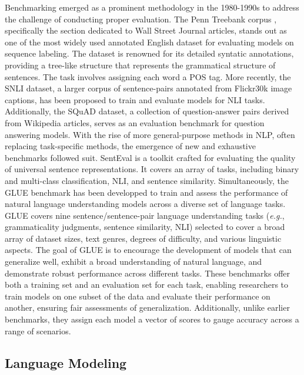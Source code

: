 Benchmarking emerged as a prominent methodology in the 1980-1990s to address the challenge of conducting proper evaluation. 
The Penn Treebank corpus \citep{marcus1993building}, specifically the section dedicated to Wall Street Journal articles, stands out as one of the most widely used annotated English dataset for evaluating models on sequence labeling. The dataset is renowned for its detailed syntatic annotations, providing a tree-like structure that represents the grammatical structure of sentences. The task involves assigning each word a \ac{POS} tag. 
More recently, the \ac{SNLI} dataset, a larger corpus of sentence-pairs annotated from Flickr30k image captions, has been proposed to train and evaluate models for \ac{NLI} tasks. Additionally, the \ac{SQuAD} \citep{rajpurkar2016squad} dataset, a collection of question-answer pairs derived from Wikipedia articles, serves as an evaluation benchmark for question answering models. 
With the rise of more general-purpose methods in \ac{NLP}, often replacing task-specific methods, the emergence of new and exhaustive benchmarks followed suit. SentEval \citep{conneau2018senteval} is a toolkit crafted for evaluating the quality of universal sentence representations. It covers an array of tasks, including binary and multi-class classification, \ac{NLI}, and sentence similarity. Simultaneously, the \ac{GLUE} benchmark \citep{wang2018glue} has been developped to train and assess the performance of natural language understanding models across a diverse set of language tasks. \ac{GLUE} covers nine sentence/sentence-pair language understanding tasks (\textit{e.g.}, grammaticality judgments, sentence similarity, \ac{NLI}) selected to cover a broad array of dataset sizes, text genres, degrees of difficulty, and various linguistic aspects. The goal of \ac{GLUE} is to encourage the development of models that can generalize well, exhibit a broad understanding of natural language, and demonstrate robust performance across different tasks. 
These benchmarks offer both a training set and an evaluation set for each task, enabling researchers to train models on one subset of the data and evaluate their performance on another, ensuring fair assessments of generalization. Additionally, unlike earlier benchmarks, they assign each model a vector of scores to gauge accuracy across a range of scenarios.


\subsection{Language Modeling}

